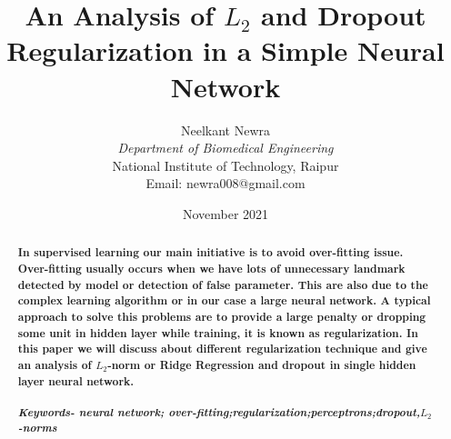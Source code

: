 \documentclass{article}
\title{\textbf{An Analysis of $L_2$ and Dropout Regularization in a Simple Neural Network}}
\author{Neelkant Newra \\ \textit{Department of Biomedical Engineering} \\ National Institute of Technology, Raipur \\ Email: newra008@gmail.com}
\date{November 2021}
\begin{document}
\maketitle

\begin{abstract}\textbf{
    In supervised learning our main initiative is to avoid over-fitting issue. Over-fitting usually occurs when we have lots of unnecessary landmark detected by model or detection of false parameter. This are also due to the complex learning algorithm or in our case a large neural network. A typical approach to solve this problems are to provide a large penalty or dropping some unit in hidden layer while training, it is known as regularization. In this paper we  will discuss about different regularization technique and give an analysis of $L_2$-norm or Ridge Regression and dropout in single hidden layer neural network.} \\ \\
    \textbf{\textit{Keywords- neural network; over-fitting;regularization;perceptrons;dropout,$L_2$-norms}}
\end{abstract}
\end{document}
